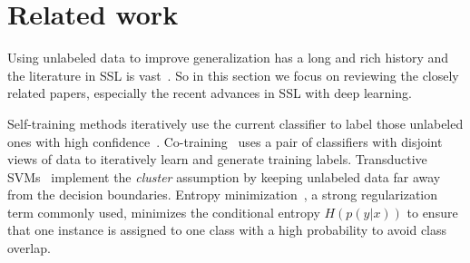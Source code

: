 \documentclass[10pt,twocolumn,letterpaper]{article}
\newcommand{\junz}[1]{{\color{red}{\bf\sf [JZ: #1]}}}
\begin{document}
\section{Related work}\vspace{-0.1cm}
\label{sec:related}
Using unlabeled data to improve generalization has a long and rich history and the literature in SSL is vast~\cite{zhu2006semi,chapelle2009semi}.
So in this section we focus on reviewing the closely related papers, especially the recent advances in SSL with deep learning.

Self-training methods iteratively use the current classifier to label those unlabeled ones with high confidence~\cite{rosenberg2005semi}. Co-training~\cite{blum1998combining,nigam2000analyzing} uses a pair of classifiers with disjoint views of data to iteratively learn and generate training labels.
Transductive SVMs~\cite{joachims1999transductive} implement the \emph{cluster} assumption by keeping unlabeled data far away from the decision boundaries. Entropy minimization~\cite{grandvalet2005semi}, a strong regularization term commonly used, minimizes the conditional entropy $H\left(p\left(y|x\right)\right)$ to ensure that one instance is assigned to one class with a high probability to avoid class overlap.

\end{document}
